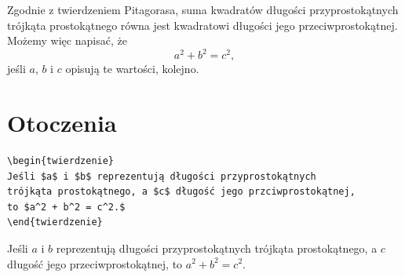 \documentclass[oneside]{amuthesis}
\begin{document}
Zgodnie z twierdzeniem Pitagorasa, suma kwadratów długości
przyprostokątnych trójkąta prostokątnego równa jest kwadratowi
długości jego przeciwprostokątnej. Możemy więc napisać, że
$$a^2 + b^2 = c^2,$$ jeśli $a$, $b$ i $c$ opisują
te wartości, kolejno.

\section{Otoczenia}

\begin{verbatim}
\begin{twierdzenie}
Jeśli $a$ i $b$ reprezentują długości przyprostokątnych
trójkąta prostokątnego, a $c$ długość jego przciwprostokątnej,
to $a^2 + b^2 = c^2.$
\end{twierdzenie}
\end{verbatim}

\begin{twierdzenie}
Jeśli $a$ i $b$ reprezentują długości przyprostokątnych
trójkąta prostokątnego, a $c$ długość jego przeciwprostokątnej,
to $a^2 + b^2 = c^2.$
\end{twierdzenie}
\end{document}
